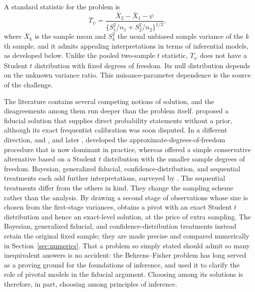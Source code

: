 \documentclass[12pt]{article}
\begin{document}
A standard statistic for the problem is
\[
T_\psi
=
\frac{\bar X_2-\bar X_1-\psi}
{\{S_1^2/n_1+S_2^2/n_2\}^{1/2}},
\]
where \(\bar X_k\) is the sample mean and \(S_k^2\) the usual unbiased sample
variance of the \(k\)th sample, and it admits appealing interpretations in terms
of inferential models, as developed below.  Unlike the
pooled two-sample \(t\) statistic, \(T_\psi\) does not have a Student \(t\)
distribution with fixed degrees of freedom.  Its null distribution depends on
the unknown variance ratio.  This nuisance-parameter dependence is the source
of the challenge.

The literature contains several competing notions of solution, and the
disagreements among them run deeper than the problem itself.  \citet{Fisher1935}
proposed a fiducial solution that supplies direct probability statements without
a prior, although its exact frequentist calibration was soon disputed.  In a
different direction, \citet{Welch1938} and \citet{Satterthwaite1946}, and later
\citet{Welch1947}, developed the approximate-degrees-of-freedom procedure that is
now dominant in practice, whereas \citet[see also \citealp{Scheffe1970}]{Hsu1938}
offered a simple conservative alternative based on a Student \(t\) distribution
with the smaller sample degrees of freedom.  Bayesian, generalized fiducial,
confidence-distribution, and sequential treatments each add further
interpretations, surveyed by \citet{KimCohen1998}.  The sequential treatments
differ from the others in kind.  They change the sampling scheme rather than the
analysis.  By drawing a second stage of observations whose size is chosen from
the first-stage variances, \citet{Stein1945} obtains a pivot with an exact
Student \(t\) distribution and hence an exact-level solution, at the price of
extra sampling.  The Bayesian, generalized fiducial, and confidence-distribution
treatments instead retain the original fixed sample; they are made precise and
compared numerically in Section~\ref{sec:numerics}.  That a problem so simply
stated should admit so many inequivalent answers is no accident: the
Behrens--Fisher problem has long served as a proving ground for the foundations
of inference, and \citet{Barnard1995Pivotal} used it to clarify the role of
pivotal models in the fiducial argument.  Choosing among its solutions is
therefore, in part, choosing among principles of inference.
\end{document}
